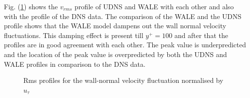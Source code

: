 Fig. (\ref{vrms udns vs wale}) shows the $v_{rms}$ profile of UDNS and WALE with each other  and also with the profile of the DNS data. The comparison of the WALE and the UDNS profile shows that the WALE model dampens out the wall normal velocity fluctuations. This damping effect is present till $y^+ = 100$ and after that the profiles are in good agreement with each other. The peak value is underpredicted and the location of the peak value is overpredicted by both the UDNS and WALE profiles in comparison to the DNS data. 
%
\begin{figure}[h!]
\begin{minipage}[b]{0.5\textwidth}
\end{minipage}
%
\begin{minipage}[b]{0.5\textwidth}
\end{minipage}
\caption{Rms profiles for the wall-normal velocity fluctuation normalised by $u_\tau$}
\label{vrms udns vs wale}
\end{figure} 
%

